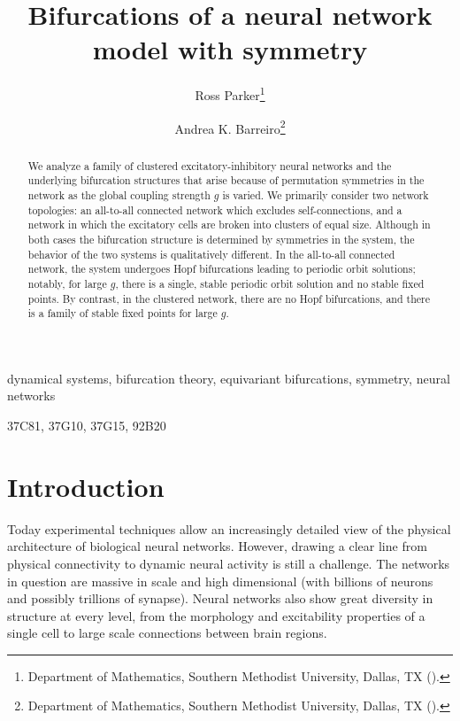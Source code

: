 \documentclass[reqno]{siamonline190516}
\title{Bifurcations of a neural network model with symmetry}
\author{Ross Parker\thanks{Department of Mathematics, Southern Methodist University, Dallas, TX (\email{rhparker@smu.edu}).}
\and Andrea K. Barreiro\thanks{Department of Mathematics, Southern Methodist University, Dallas, TX (\email{abarreiro@smu.edu}).}
}
\begin{document}

\maketitle

\begin{abstract}
We analyze a family of clustered excitatory-inhibitory neural networks and the underlying bifurcation structures that arise because of permutation symmetries in the network as the global coupling strength $g$ is varied. We primarily consider two network topologies: an all-to-all connected network which excludes self-connections, and a network in which the excitatory cells are broken into clusters of equal size. Although in both cases the bifurcation structure is determined by symmetries in the system, the behavior of the two systems is qualitatively different. In the all-to-all connected network, the system undergoes Hopf bifurcations leading to periodic orbit solutions; notably, for large $g$, there is a single, stable periodic orbit solution and no stable fixed points. By contrast, in the clustered network, there are no Hopf bifurcations, and there is a family of stable fixed points for large $g$.
\end{abstract}

\begin{keywords}
dynamical systems, bifurcation theory, equivariant bifurcations, symmetry, neural networks
\end{keywords}

\begin{AMS}
    37C81, 37G10, 37G15, 92B20
\end{AMS}

\section{Introduction}

Today experimental techniques allow an increasingly detailed view of the physical architecture of biological neural networks. However, drawing a clear line from physical connectivity to dynamic neural activity is still a challenge. The networks in question are massive in scale and high dimensional (with billions of neurons and possibly trillions of synapse).
Neural networks also show great diversity in structure at every level, from the morphology and excitability properties of a single cell to large scale connections between brain regions. 
\end{document}
